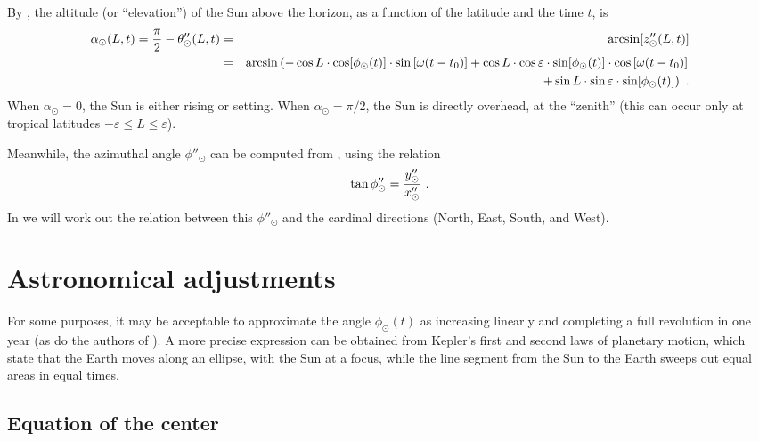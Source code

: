 By , the altitude (or ``elevation'') of the Sun above the horizon, as a function of the latitude and the time $t$, is
\begin{eqnarray}
\alpha_\odot (L, t) = \frac{\pi}{2} - \theta''_\odot (L, t) &=& \arcsin [z''_\odot (L, t)] \nn
&=& \arcsin \left( - \cos L \cdot \cos [\phi_\odot (t)] \cdot \sin \left[ \omega (t - t_0) \right]
+ \cos L \cdot \cos \varepsilon \cdot \sin [\phi_\odot (t)] \cdot \cos \left[ \omega (t - t_0) \right] \right. \nn
&&  \hskip 1.5 cm \left. +  \sin L \cdot \sin \varepsilon \cdot \sin [\phi_\odot (t)] \right)~.
\la{eq:altitude}
\end{eqnarray}
When $\alpha_\odot = 0$, the Sun is either rising or setting.  When $\alpha_\odot = \pi / 2$, the Sun is directly overhead, at the ``zenith'' (this can occur only at tropical latitudes $-\varepsilon \leq L \leq \varepsilon$).  

Meanwhile, the azimuthal angle $\phi''_\odot$ can be computed from , using the relation
\begin{equation}
\tan \phi''_\odot = \frac{y''_\odot}{x''_\odot}~.
\la{eq:terr-azimuth}
\end{equation}
In  we will work out the relation between this $\phi''_\odot$ and the cardinal directions (North, East, South, and West).

\section{Astronomical adjustments}

For some purposes, it may be acceptable to approximate the angle $\phi_\odot (t)$ as increasing linearly and completing a full revolution in one year (as do the authors of \cite{Khavrus}). A more precise expression can be obtained from Kepler's first and second laws of planetary motion, which state that the Earth moves along an ellipse, with the Sun at a focus, while the line segment from the Sun to the Earth sweeps out equal areas in equal times.

\subsection{Equation of the center}

